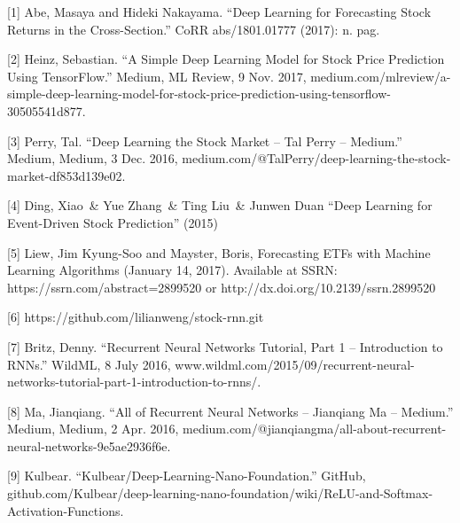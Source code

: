 \documentclass{article}
\begin{document}
[1] Abe, Masaya and Hideki Nakayama. “Deep Learning for Forecasting Stock Returns in the Cross-Section.” CoRR abs/1801.01777 (2017): n. pag.

[2] Heinz, Sebastian. “A Simple Deep Learning Model for Stock Price Prediction Using TensorFlow.” Medium, ML Review, 9 Nov. 2017, medium.com/mlreview/a-simple-deep-learning-model-for-stock-price-prediction-using-tensorflow-30505541d877.

[3] Perry, Tal. “Deep Learning the Stock Market – Tal Perry – Medium.” Medium, Medium, 3 Dec. 2016, medium.com/@TalPerry/deep-learning-the-stock-market-df853d139e02.

[4] Ding, Xiao\ \& Yue Zhang\ \& Ting Liu\ \& Junwen Duan “Deep Learning for Event-Driven Stock Prediction” (2015)

[5] Liew, Jim Kyung-Soo and Mayster, Boris, Forecasting ETFs with Machine Learning Algorithms (January 14, 2017). Available at SSRN: https://ssrn.com/abstract=2899520 or http://dx.doi.org/10.2139/ssrn.2899520

[6] https://github.com/lilianweng/stock-rnn.git

[7] Britz, Denny. “Recurrent Neural Networks Tutorial, Part 1 – Introduction to RNNs.” WildML, 8 July 2016, www.wildml.com/2015/09/recurrent-neural-networks-tutorial-part-1-introduction-to-rnns/.

[8] Ma, Jianqiang. “All of Recurrent Neural Networks – Jianqiang Ma – Medium.” Medium, Medium, 2 Apr. 2016, medium.com/@jianqiangma/all-about-recurrent-neural-networks-9e5ae2936f6e.

[9] Kulbear. “Kulbear/Deep-Learning-Nano-Foundation.” GitHub, github.com/Kulbear/deep-learning-nano-foundation/wiki/ReLU-and-Softmax-Activation-Functions.
\end{document}
